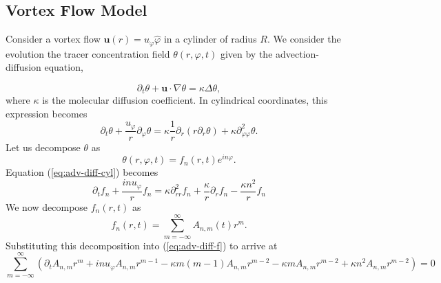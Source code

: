 \subsection{Vortex Flow Model}

Consider a vortex flow $\mathbf{u}(r)=u_{\varphi}\hat{\varphi}$ in a cylinder of radius $R$.  We consider the evolution the tracer concentration field $\theta(r,\varphi,t)$ given by the advection-diffusion equation,

\begin{equation}
\label{eq:adv-diff}
\partial_{t}\theta + \mathbf{u}\cdot \nabla \theta = \kappa \Delta \theta,
\end{equation}
where $\kappa$ is the molecular diffusion coefficient.  In cylindrical coordinates, this expression becomes
\begin{equation}
\label{eq:adv-diff-cyl}
\partial_{t}\theta + \frac{u_{\varphi}}{r}\partial_{\varphi}\theta=\kappa \frac{1}{r}\partial_{r}(r\partial_{r}\theta)+\kappa \partial_{\varphi \varphi}^{2}\theta .
\end{equation}
Let us decompose $\theta$ as \cite{Kwiatkowski2010, BAJER2001,Rhines1983}
\begin{equation}
\label{eq:th_decomp}
\theta(r,\varphi,t)=f_{n}(r,t)e^{in\varphi}.
\end{equation}
Equation (\ref{eq:adv-diff-cyl}) becomes
\begin{equation}
\label{eq:adv-diff-f}
\partial_t f_{n} + \frac{in u_{\varphi}}{r}f_{n} = \kappa \partial_{rr}^{2}f_{n}+ \frac{\kappa}{r}\partial_r f_{n} -\frac{\kappa n^2}{r}f_{n}
\end{equation}
We now decompose $f_{n}(r,t)$ as
\begin{equation}
f_{n}(r,t)=\sum_{m=-\infty}^{\infty}A_{n,m}(t)r^{m}.
\end{equation}
Substituting this decomposition into (\ref{eq:adv-diff-f}) to arrive at
\begin{equation}
\sum_{m=-\infty}^{\infty}\left(\partial_{t}A_{n,m} r^m + inu_{\varphi}A_{n,m} r^{m-1} - \kappa m (m-1)A_{n,m}r^{m-2} -  \kappa m A_{n,m}r^{m-2} + \kappa  n^2 A_{n,m} r^{m-2}  \right) = 0
\end{equation}

